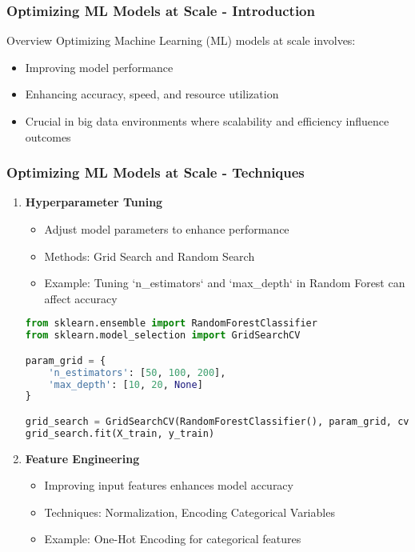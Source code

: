 \documentclass[aspectratio=169]{beamer}
\begin{document}
\begin{frame}[fragile]
    \frametitle{Optimizing ML Models at Scale - Introduction}
    \begin{block}{Overview}
        Optimizing Machine Learning (ML) models at scale involves:
        \begin{itemize}
            \item Improving model performance
            \item Enhancing accuracy, speed, and resource utilization
            \item Crucial in big data environments where scalability and efficiency influence outcomes
        \end{itemize}
    \end{block}
\end{frame}

\begin{frame}[fragile]
    \frametitle{Optimizing ML Models at Scale - Techniques}
    \begin{enumerate}
        \item \textbf{Hyperparameter Tuning}
            \begin{itemize}
                \item Adjust model parameters to enhance performance
                \item Methods: Grid Search and Random Search
                \item Example: Tuning `n\_estimators` and `max\_depth` in Random Forest can affect accuracy
            \end{itemize}
            \begin{lstlisting}[language=Python]
from sklearn.ensemble import RandomForestClassifier
from sklearn.model_selection import GridSearchCV

param_grid = {
    'n_estimators': [50, 100, 200],
    'max_depth': [10, 20, None]
}

grid_search = GridSearchCV(RandomForestClassifier(), param_grid, cv=5)
grid_search.fit(X_train, y_train)
            \end{lstlisting}
        
        \item \textbf{Feature Engineering}
            \begin{itemize}
                \item Improving input features enhances model accuracy
                \item Techniques: Normalization, Encoding Categorical Variables
                \item Example: One-Hot Encoding for categorical features
            \end{itemize}
    \end{enumerate}
\end{frame}
\end{document}
